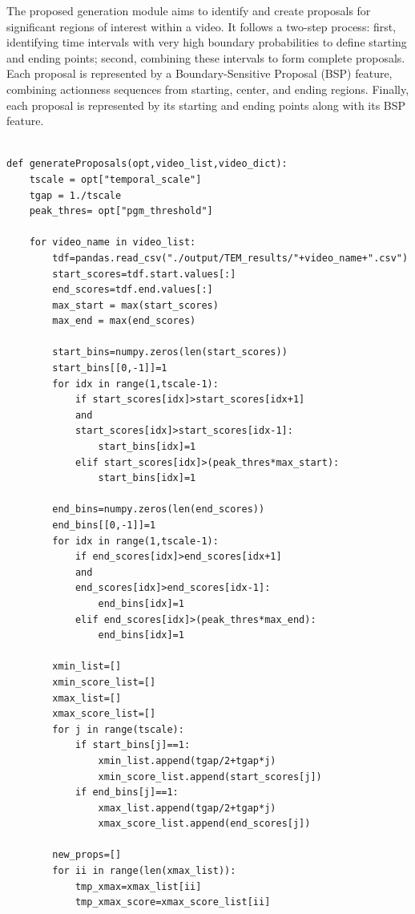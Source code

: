 The proposed generation module aims to identify and create proposals for significant regions of interest within a video. It follows a two-step process: first, identifying time intervals with very high boundary probabilities to define starting and ending points; second, combining these intervals to form complete proposals. Each proposal is represented by a Boundary-Sensitive Proposal (BSP) feature, combining actionness sequences from starting, center, and ending regions. Finally, each proposal is represented by its starting and ending points along with its BSP feature.
\begin{lstlisting}[style=python]

def generateProposals(opt,video_list,video_dict):
    tscale = opt["temporal_scale"]    
    tgap = 1./tscale
    peak_thres= opt["pgm_threshold"]

    for video_name in video_list:
        tdf=pandas.read_csv("./output/TEM_results/"+video_name+".csv")
        start_scores=tdf.start.values[:]
        end_scores=tdf.end.values[:]        
        max_start = max(start_scores)
        max_end = max(end_scores)
        
        start_bins=numpy.zeros(len(start_scores))
        start_bins[[0,-1]]=1
        for idx in range(1,tscale-1):
            if start_scores[idx]>start_scores[idx+1] 
            and
            start_scores[idx]>start_scores[idx-1]:
                start_bins[idx]=1
            elif start_scores[idx]>(peak_thres*max_start):
                start_bins[idx]=1
                    
        end_bins=numpy.zeros(len(end_scores))
        end_bins[[0,-1]]=1
        for idx in range(1,tscale-1):
            if end_scores[idx]>end_scores[idx+1] 
            and
            end_scores[idx]>end_scores[idx-1]:
                end_bins[idx]=1
            elif end_scores[idx]>(peak_thres*max_end):
                end_bins[idx]=1
        
        xmin_list=[]
        xmin_score_list=[]
        xmax_list=[]
        xmax_score_list=[]
        for j in range(tscale):
            if start_bins[j]==1:
                xmin_list.append(tgap/2+tgap*j)
                xmin_score_list.append(start_scores[j])
            if end_bins[j]==1:
                xmax_list.append(tgap/2+tgap*j)
                xmax_score_list.append(end_scores[j])
                
        new_props=[]
        for ii in range(len(xmax_list)):
            tmp_xmax=xmax_list[ii]
            tmp_xmax_score=xmax_score_list[ii]
            

\end{lstlisting}
